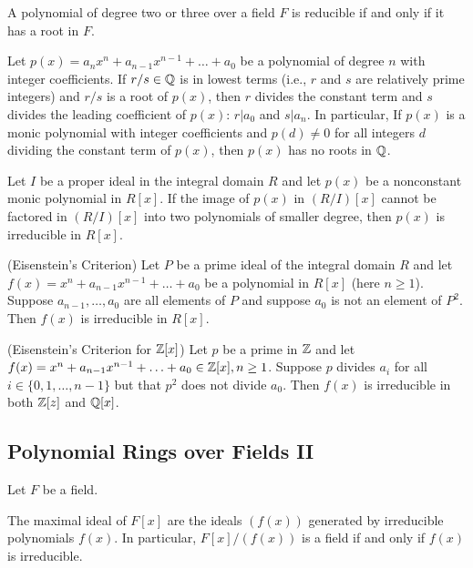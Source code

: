 \documentclass[../main]{subfiles}
\begin{document}
\begin{prop}
 A polynomial of degree two or three over a field $F$ is reducible if and only if it has a root in $F$.
\end{prop}


\begin{prop}
 Let $p(x) = a_n x^n + a_{n-1} x^{n-1} + \ldots + a_0$ be a polynomial of degree $n$ with integer coefficients. If $r/s \in \mathbb{Q}$ is in lowest terms (i.e., $r$ and $s$ are relatively prime integers) and $r/s$ is a root of $p(x)$, then $r$ divides the constant term and $s$ divides the leading coefficient of $p(x)$: $r|a_0$ and $s|a_n$. In particular, If $p(x)$ is a monic polynomial with integer coefficients and $p(d) \neq 0$ for all integers $d$ dividing the constant term of $p(x)$, then $p(x)$ has no roots in $\mathbb{Q}$.
\end{prop}


\begin{prop}
 Let $I$ be a proper ideal in the integral domain $R$ and let $p(x)$ be a nonconstant monic polynomial in $R[x]$. If the image of $p(x)$ in $(R/I)[x]$ cannot be factored in $(R/I)[x]$ into two polynomials of smaller degree, then $p(x)$ is irreducible in $R[x]$.
\end{prop}


\begin{prop}
 (Eisenstein's Criterion) Let $P$ be a prime ideal of the integral domain $R$ and let $f(x) = x^n + a_{n-1} x^{n-1} + \ldots + a_0$ be a polynomial in $R[x]$ (here $n\geq 1$). Suppose $a_{n-1}, \ldots, a_0$ are all elements of $P$ and suppose $a_0$ is not an element of $P^2$. Then $f(x)$ is irreducible in $R[x]$.
\end{prop}


\begin{cor}
 (Eisenstein's Criterion for $\mathbb{Z}[x]$) Let $p$ be a prime in $\mathbb{Z}$ and let $f(x) = x^n + a_{n-1} x^{n-1} + \ldots + a_0 \in \mathbb{Z}[x], n \geq 1$. Suppose $p$ divides $a_i$ for all $i \in \{ 0, 1, \ldots, n-1 \}$ but that $p^2$ does not divide $a_0$. Then $f(x)$ is irreducible in both $\mathbb{Z}[z]$ and $\mathbb{Q}[x]$.
\end{cor}


\subsection{Polynomial Rings over Fields II}

Let $F$ be a field.


\begin{prop}
 The maximal ideal of $F[x]$ are the ideals $(f(x))$ generated by irreducible polynomials $f(x)$. In particular, $F[x]/(f(x))$ is a field if and only if $f(x)$ is irreducible.
\end{prop}
\end{document}
